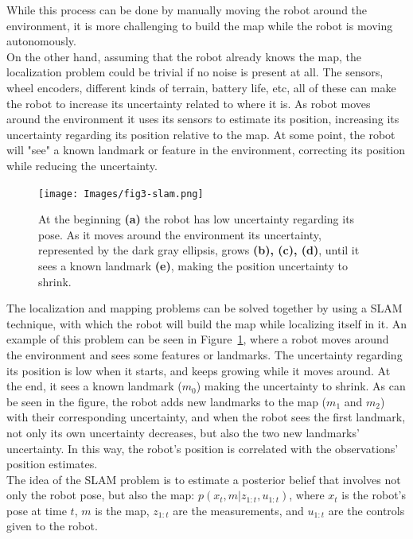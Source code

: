 While this process can be done by manually moving the robot around the environment, it is more challenging to build the map while the robot is moving autonomously. \\

On the other hand, assuming that the robot already knows the map, the localization problem could be trivial if no noise is present at all. The sensors, wheel encoders, different kinds of terrain, battery life, etc, all of these can make the robot to increase its uncertainty related to where it is. As robot moves around the environment it uses its sensors to estimate its position, increasing its uncertainty regarding its position relative to the map. At some point, the robot will "see" a known landmark or feature in the environment, correcting its position while reducing the uncertainty.\\
\begin{figure}
    \centering
    \texttt{[image: Images/fig3-slam.png]}
    \caption[Example of SLAM problem]{At the beginning \textbf{(a)} the robot has low uncertainty regarding its pose. As it moves around the environment its uncertainty, represented by the dark gray ellipsis, grows \textbf{(b), (c), (d)}, until it sees a known landmark \textbf{(e)}, making the position uncertainty to shrink. \cite{intro-aut-mobile-robots}}
    \label{fig:chapter1:slam}
\end{figure}

The localization and mapping problems can be solved together by using a \ac{SLAM} technique, with which the robot will build the map while localizing itself in it. An example of this problem can be seen in Figure~\ref{fig:chapter1:slam}, where a robot moves around the environment and sees some features or landmarks. The uncertainty regarding its position is low when it starts, and keeps growing while it moves around. At the end, it sees a known landmark ($m_0$) making the uncertainty to shrink. As can be seen in the figure, the robot adds new landmarks to the map ($m_1$ and $m_2$) with their corresponding uncertainty, and when the robot sees the first landmark, not only its own uncertainty decreases, but also the two new landmarks' uncertainty. In this way, the robot's position is correlated with the observations' position estimates.\\

The idea of the \ac{SLAM} problem is to estimate a posterior belief that involves not only the robot pose, but also the map: $p\left(x_t, m | z_{1:t}, u_{1:t}\right)$, where $x_t$ is the robot's pose at time $t$, $m$ is the map, $z_{1:t}$ are the measurements, and $u_{1:t}$ are the controls given to the robot.

